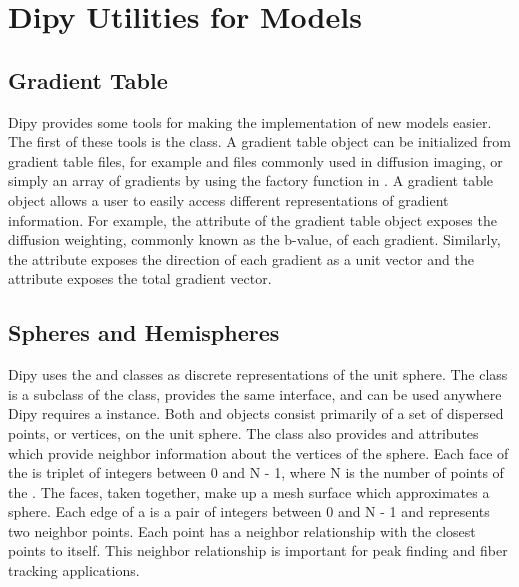 \section{Dipy Utilities for Models}

\subsection{Gradient Table}
Dipy provides some tools for making the implementation of new models easier. The first of these tools is the  class. A gradient table object can be initialized from gradient table files, for example  and  files commonly used in diffusion imaging, or simply an array of gradients by using the  factory function in . A gradient table object allows a user to easily access different representations of gradient information. For example, the  attribute of the gradient table object exposes the diffusion weighting, commonly known as the b-value, of each gradient. Similarly, the  attribute exposes the direction of each gradient as a unit vector and the  attribute exposes the total gradient vector.

\subsection{Spheres and Hemispheres}
Dipy uses the  and  classes as discrete representations of the unit sphere. The  class is a subclass of the  class, provides the same interface, and can be used anywhere Dipy requires a  instance.  Both  and  objects consist primarily of a set of dispersed points, or vertices, on the unit sphere. The  class also provides  and  attributes which provide neighbor information about the vertices of the sphere. Each face of the  is triplet of integers between 0 and N - 1, where N is the number of points of the . The faces, taken together, make up a mesh surface which approximates a sphere. Each edge of a  is a pair of integers between 0 and N - 1 and represents two neighbor points. Each point has a neighbor relationship with the closest points to itself. This neighbor relationship is important for peak finding and fiber tracking applications.

